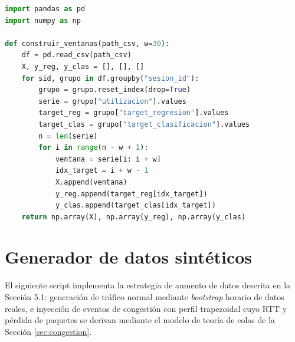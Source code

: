 \documentclass[12pt]{report}
\begin{document}
\begin{lstlisting}[language=Python, caption={Construcción de secuencias mediante ventana deslizante, respetando fronteras de sesión.}, label={lst:apx_ventaneo}]
import pandas as pd
import numpy as np

def construir_ventanas(path_csv, w=30):
    df = pd.read_csv(path_csv)
    X, y_reg, y_clas = [], [], []
    for sid, grupo in df.groupby("sesion_id"):
        grupo = grupo.reset_index(drop=True)
        serie = grupo["utilizacion"].values
        target_reg = grupo["target_regresion"].values
        target_clas = grupo["target_clasificacion"].values
        n = len(serie)
        for i in range(n - w + 1):
            ventana = serie[i: i + w]
            idx_target = i + w - 1
            X.append(ventana)
            y_reg.append(target_reg[idx_target])
            y_clas.append(target_clas[idx_target])
    return np.array(X), np.array(y_reg), np.array(y_clas)
\end{lstlisting}

\section{Generador de datos sintéticos}
\label{apx:generador_sintetico}

El siguiente script implementa la estrategia de aumento de datos descrita en la Sección 5.1: generación de tráfico normal mediante \textit{bootstrap} horario de datos reales, e inyección de eventos de congestión con perfil trapezoidal cuyo RTT y pérdida de paquetes se derivan mediante el modelo de teoría de colas de la Sección \ref{sec:congestion}.
\end{document}
